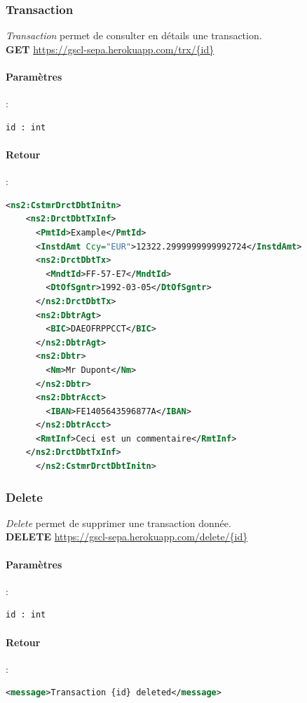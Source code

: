 \documentclass{article}
\begin{document}
      \subsubsection{Transaction}
	\emph{Transaction} permet de consulter en détails une transaction.\\
	\textbf{GET} \url{https://gscl-sepa.herokuapp.com/trx/{id}}
	\paragraph{Paramètres}:
	  \begin{lstlisting}[language=xml]
      id : int
	  \end{lstlisting}
	\paragraph{Retour}:
	  \begin{lstlisting}[language=xml]
      <ns2:CstmrDrctDbtInitn>
	<ns2:DrctDbtTxInf>
	  <PmtId>Example</PmtId>
	  <InstdAmt Ccy="EUR">12322.2999999999992724</InstdAmt>
	  <ns2:DrctDbtTx>
	    <MndtId>FF-57-E7</MndtId>
	    <DtOfSgntr>1992-03-05</DtOfSgntr>
	  </ns2:DrctDbtTx>
	  <ns2:DbtrAgt>
	    <BIC>DAEOFRPPCCT</BIC>
	  </ns2:DbtrAgt>
	  <ns2:Dbtr>
	    <Nm>Mr Dupont</Nm>
	  </ns2:Dbtr>
	  <ns2:DbtrAcct>
	    <IBAN>FE1405643596877A</IBAN>
	  </ns2:DbtrAcct>
	  <RmtInf>Ceci est un commentaire</RmtInf>
	</ns2:DrctDbtTxInf>
      </ns2:CstmrDrctDbtInitn>
	  \end{lstlisting}
	  
      \subsubsection{Delete}
	\emph{Delete} permet de supprimer une transaction donnée. \\
	\textbf{DELETE} \url{https://gscl-sepa.herokuapp.com/delete/{id}}
	\paragraph{Paramètres}:
	  \begin{lstlisting}[language=xml]
      id : int
	  \end{lstlisting}
	\paragraph{Retour}:
	  \begin{lstlisting}[language=xml]
      <message>Transaction {id} deleted</message>
	  \end{lstlisting}
    
\end{document}
